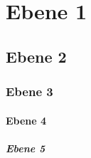 \section{Ebene 1}
\subsection{Ebene 2}
\subsubsection{Ebene 3}
\paragraph{Ebene 4}
\subparagraph{Ebene 5}
